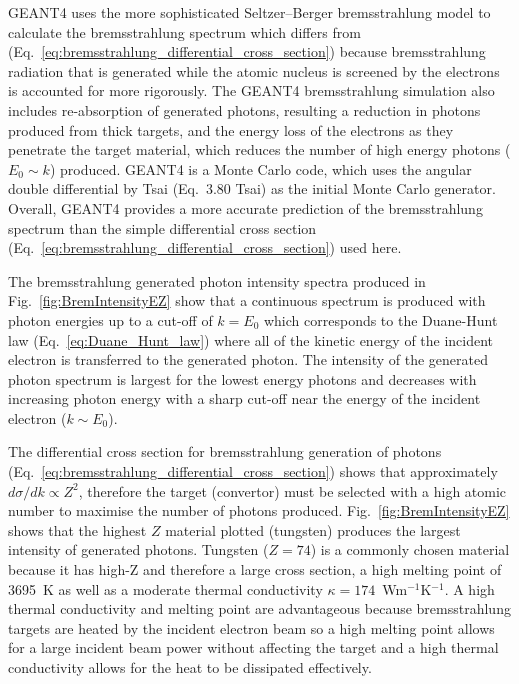 \documentclass[../main.tex]{subfiles}
\begin{document}
\textsc{GEANT4} uses the more sophisticated Seltzer--Berger bremsstrahlung model \cite{seltzer1986bremsstrahlung,seltzer1985bremsstrahlung} to calculate the bremsstrahlung spectrum which differs from (Eq.~\ref{eq:bremsstrahlung_differential_cross_section}) because bremsstrahlung radiation that is generated while the atomic nucleus is screened by the electrons is accounted for more rigorously. The \textsc{GEANT4} bremsstrahlung simulation \cite{agostinelli2003geant4} also includes re-absorption of generated photons, resulting a reduction in photons produced from thick targets, and the energy loss of the electrons as they penetrate the target material, which reduces the number of high energy photons ($E_{0}\sim k$) produced. \textsc{GEANT4} is a Monte Carlo code, which uses the angular double differential by Tsai (Eq.~3.80 Tsai) \cite{tsai1974pair,tsai1977erratum} as the initial Monte Carlo generator. Overall, \textsc{GEANT4} provides a more accurate prediction of the bremsstrahlung spectrum than the simple differential cross section (Eq.~\ref{eq:bremsstrahlung_differential_cross_section}) used here.

The bremsstrahlung generated photon intensity spectra produced in Fig.~\ref{fig:BremIntensityEZ} show that a continuous spectrum is produced with photon energies up to a cut-off of $k = E_{0}$ which corresponds to the Duane-Hunt law (Eq.~\ref{eq:Duane_Hunt_law}) where all of the kinetic energy of the incident electron is transferred to the generated photon. The intensity of the generated photon spectrum is largest for the lowest energy photons and decreases with increasing photon energy with a sharp cut-off near the energy of the incident electron ($k \sim E_{0}$).

The differential cross section for bremsstrahlung generation of photons (Eq.~\ref{eq:bremsstrahlung_differential_cross_section}) shows that approximately $d\sigma/dk \propto Z^{2}$, therefore the target (convertor) must be selected with a high atomic number to maximise the number of photons produced. Fig.~\ref{fig:BremIntensityEZ} shows that the highest $Z$ material plotted (tungsten) produces the largest intensity of generated photons. Tungsten ($Z = 74$) is a commonly chosen material because it has high-Z and therefore a large cross section, a high melting point of 3695~\si{\kelvin} as well as a moderate thermal conductivity $\kappa = 174$~\si{\watt}\si{\meter}$^{-1}$\si{\kelvin}$^{-1}$. A high thermal conductivity and melting point are advantageous because bremsstrahlung targets are heated by the incident electron beam so a high melting point allows for a large incident beam power without affecting the target and a high thermal conductivity allows for the heat to be dissipated effectively. 
\end{document}
